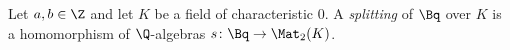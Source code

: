 Let $a,b\in\Z$ and let $K$ be a field of characteristic $0$. A \emph{splitting} of $\Bq$ over $K$ is a homomorphism of $\Q$-algebras
$s\colon\Bq\to\Mat_2(K)$.
